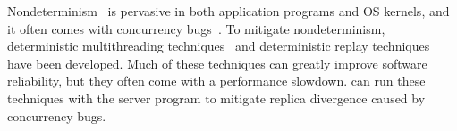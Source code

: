 


Nondeterminism~\cite{racepro:sosp11,dmp:asplos09,coredet:asplos10,
cui:tern:osdi10, kendo:asplos09,
dthreads:sosp11,peregrine:sosp11,parrot:sosp13,determinator:osdi10} is 
pervasive in both application programs and OS kernels, and it often comes with 
concurrency bugs~\cite{lu:concurrency-bugs}. To mitigate nondeterminism, 
deterministic multithreading techniques~\cite{grace:oopsla09, 
dthreads:sosp11, 
determinator:osdi10,dpj:oopsla09, 
dmp:asplos09,kendo:asplos09,coredet:asplos10,dos:osdi10,ddos:asplos13,
ics:oopsla13} and deterministic replay 
techniques~\cite{r2:osdi,friday2007,srinivasan:flashback,revirt,dejavu,
vmware-record-replay,smp-revirt:vee08,pres:sosp09,scribe:sigmetrics10,
odr:sosp09, capo:asplos09} have been developed. Much of these techniques can 
greatly improve software reliability, but they often come with a performance 
slowdown. \xxx can run these techniques with the server program to mitigate 
replica divergence caused by concurrency bugs. 



